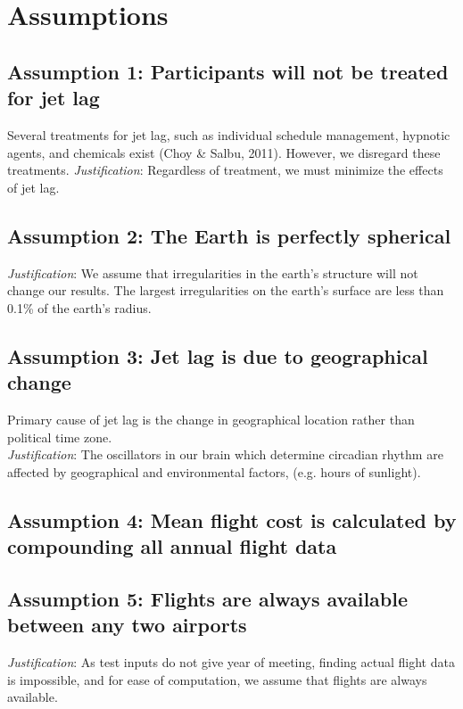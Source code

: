 \section{Assumptions}
\subsection*{Assumption 1: Participants will not be treated for jet lag}
Several treatments for jet lag, such as individual schedule management, hypnotic agents, and chemicals exist (Choy \& Salbu, 2011). However, we disregard these treatments.
\textit{Justification}: Regardless of treatment, we must minimize the effects of jet lag.  
\subsection*{Assumption 2: The Earth is perfectly spherical}
\textit{Justification}: We assume that irregularities in the earth’s structure will not change our results. The largest irregularities on the earth’s surface are less than 0.1\% of the earth’s radius.
\subsection*{Assumption 3: Jet lag is due to geographical change}
Primary cause of jet lag is the change in geographical location rather than political time zone.\\ 
\textit{Justification}: The oscillators in our brain which determine circadian rhythm are affected by geographical and environmental factors, (e.g. hours of sunlight).
\subsection*{Assumption 4: Mean flight cost is calculated by compounding all annual flight data}

\subsection*{Assumption 5: Flights are always available between any two airports}
\textit{Justification}: As test inputs do not give year of meeting, finding actual flight data is impossible, and for ease of computation, we assume that flights are always available.
